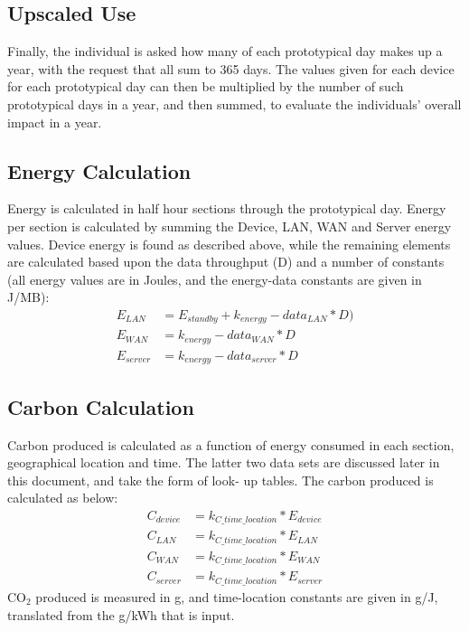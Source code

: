 \documentclass[conference]{IEEEtran}
\begin{document}
\subsection{Upscaled Use}

Finally, the individual is asked how many of each prototypical day
makes up a year, with the request that all sum to 365 days. The values
given for each device for each prototypical day can then be multiplied
by the number of such prototypical days in a year, and then summed, to
evaluate the individuals' overall impact in a year.

\subsection{Energy Calculation}

Energy is calculated in half hour sections through the prototypical
day. Energy per section is calculated by summing the Device, LAN, WAN
and Server energy values. Device energy is found as described above,
while the remaining elements are calculated based upon the data
throughput (D) and a number of constants (all energy values are in
Joules, and the energy-data constants are given in J/MB):
\begin{align*}
E_{LAN} &= E_{standby} + k_{energy}-data_{LAN} * D)\\
E_{WAN} &= k_{energy}-data_{WAN} * D\\
E_{server} &= k_{energy}-data_{server} * D
\end{align*}

\subsection{Carbon Calculation}

Carbon produced is calculated as a function of energy consumed in each
section, geographical location and time. The latter two data sets are
discussed later in this document, and take the form of look- up
tables. The carbon produced is calculated as below:
\begin{align*}
C_{device} &= k_{C\_time\_location} * E_{device}\\
C_{LAN} &= k_{C\_time\_location} * E_{LAN}\\
C_{WAN} &= k_{C\_time\_location} * E_{WAN}\\
C_{server} &= k_{C\_time\_location} * E_{server}
\end{align*}
CO$_2$ produced is measured in g, and time-location constants are
given in g/J, translated from the g/kWh that is input.
\end{document}
